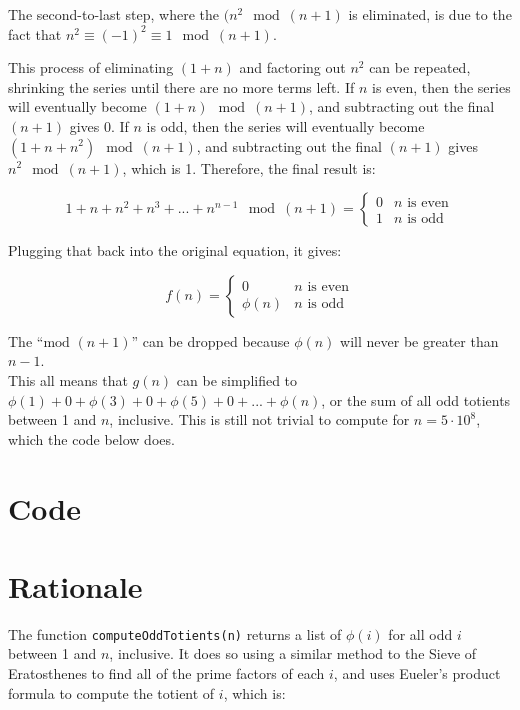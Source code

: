\documentclass[11pt]{article}
\begin{document}
The second-to-last step, where the $(n^2 \mod (n+1)$ is eliminated, is due to the fact that $n^2 \equiv (-1)^2 \equiv 1 \mod (n+1)$.

This process of eliminating $(1+n)$ and factoring out $n^2$ can be repeated, shrinking the series until there are no more terms left. If $n$ is even, then the series will eventually become $(1 + n) \mod (n+1)$, and subtracting out the final $(n + 1)$ gives 0. If $n$ is odd, then the series will eventually become $(1 + n + n^2) \mod (n+1)$, and subtracting out the final $(n+1)$ gives $n^2 \mod (n+1)$, which is 1. Therefore, the final result is:

\begin{equation*}
1 + n + n^2 + n^3 + ... + n^{n-1} \mod (n+1) = \begin{cases}
0 &\text{$n$ is even}\\
1 &\text{$n$ is odd}
\end{cases}
\end{equation*}

Plugging that back into the original equation, it gives:

\begin{equation*}
f(n) = \begin{cases}
0 &\text{$n$ is even}\\
\phi(n) &\text{$n$ is odd}
\end{cases}
\end{equation*}

The ``$\text{mod } (n+1)$'' can be dropped because $\phi(n)$ will never be greater than $n - 1$.\\

This all means that $g(n)$ can be simplified to $\phi(1) + 0 + \phi(3) + 0 + \phi(5) + 0 + ... + \phi(n)$, or the sum of all odd totients between 1 and $n$, inclusive. This is still not trivial to compute for $n = 5 \cdot 10^8$, which the code below does.

\section{Code}


\section{Rationale}

The function \verb!computeOddTotients(n)! returns a list of $\phi(i)$ for all odd $i$ between 1 and $n$, inclusive. It does so using a similar method to the Sieve of Eratosthenes to find all of the prime factors of each $i$, and uses Eueler's product formula to compute the totient of $i$, which is: 
\end{document}
